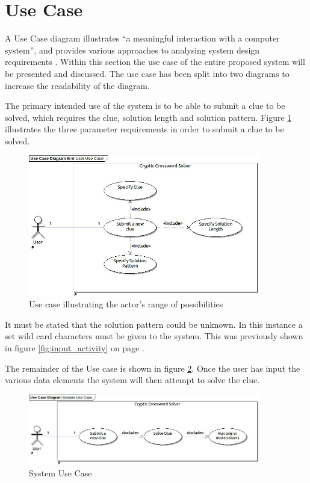 \section{Use Case}
\label{sec:use_case}

A Use Case diagram illustrates ``a meaningful interaction with a computer 
system'', and provides various approaches to analysing system design 
requirements \citep{lunn03}. Within this section the use case of the entire 
proposed system will be presented and discussed. The use case has been split 
into two diagrams to increase the readability of the diagram.

The primary intended use of the system is to be able to submit a clue to be 
solved, which requires the clue, solution length and solution pattern. Figure 
\ref{fig:end_user_use_case} illustrates the three parameter requirements in 
order to submit a clue to be solved.

\begin{figure}[H]
  \centering
  \includegraphics[width=0.9\textwidth]{use_case/end_user_use_case.jpg}
  \caption{Use case illustrating the actor's range of possibilities}
  \label{fig:end_user_use_case}
\end{figure}

It must be stated that the solution pattern could be unknown. In this instance a
set wild card characters must be given to the system. This was previously shown
in figure \ref{fig:input_activity} on page \pageref{fig:input_activity}. 

The remainder of the Use case is shown in figure \ref{fig:system_use_case}. Once
the user has input the various data elements the system will then attempt to 
solve the clue. 

\begin{figure}[H]
  \centering
  \includegraphics[width=0.9\textwidth]{use_case/system_use_case.jpg}
  \caption{System Use Case}
  \label{fig:system_use_case}
\end{figure}

